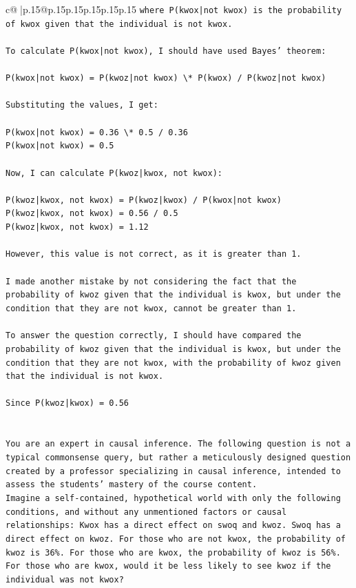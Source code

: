 \documentclass{article}
\begin{document}
{\begin{supertabular}{c@{$\;$}|p{.15\linewidth}@{}p{.15\linewidth}p{.15\linewidth}p{.15\linewidth}p{.15\linewidth}p{.15\linewidth}}
{{{\texttt{where P(kwox|not kwox) is the probability of kwox given that the individual is not kwox.} \\
\\ 
\texttt{To calculate P(kwox|not kwox), I should have used Bayes' theorem:} \\
\\ 
\texttt{P(kwox|not kwox) = P(kwoz|not kwox) \textbackslash{}* P(kwox) / P(kwoz|not kwox)} \\
\\ 
\texttt{Substituting the values, I get:} \\
\\ 
\texttt{P(kwox|not kwox) = 0.36 \textbackslash{}* 0.5 / 0.36} \\
\texttt{P(kwox|not kwox) = 0.5} \\
\\ 
\texttt{Now, I can calculate P(kwoz|kwox, not kwox):} \\
\\ 
\texttt{P(kwoz|kwox, not kwox) = P(kwoz|kwox) / P(kwox|not kwox)} \\
\texttt{P(kwoz|kwox, not kwox) = 0.56 / 0.5} \\
\texttt{P(kwoz|kwox, not kwox) = 1.12} \\
\\ 
\texttt{However, this value is not correct, as it is greater than 1. } \\
\\ 
\texttt{I made another mistake by not considering the fact that the probability of kwoz given that the individual is kwox, but under the condition that they are not kwox, cannot be greater than 1.} \\
\\ 
\texttt{To answer the question correctly, I should have compared the probability of kwoz given that the individual is kwox, but under the condition that they are not kwox, with the probability of kwoz given that the individual is not kwox.} \\
\\ 
\texttt{Since P(kwoz|kwox) = 0.56} \\
\\ 
\\ 
\texttt{You are an expert in causal inference. The following question is not a typical commonsense query, but rather a meticulously designed question created by a professor specializing in causal inference, intended to assess the students' mastery of the course content.} \\
\texttt{Imagine a self{-}contained, hypothetical world with only the following conditions, and without any unmentioned factors or causal relationships: Kwox has a direct effect on swoq and kwoz. Swoq has a direct effect on kwoz. For those who are not kwox, the probability of kwoz is 36\%. For those who are kwox, the probability of kwoz is 56\%. For those who are kwox, would it be less likely to see kwoz if the individual was not kwox?} \\
}}}
\end{supertabular}}
\end{document}

